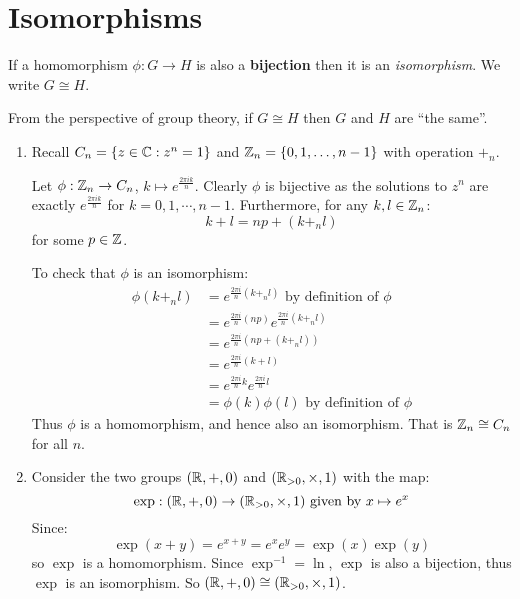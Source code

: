 \documentclass[../main.tex]{subfiles}
\begin{document}
\section{Isomorphisms}
\begin{definition}[Isomorphism]
  If a homomorphism $\phi: G \to H$ is also a \textbf{bijection} then it is an \textit{isomorphism}. We write $G \cong H$.
\end{definition}
From the perspective of group theory, if $G \cong H$ then $G$ and $H$ are ``the same''.
\begin{example}
  \begin{enumerate}
    \item Recall $C_n = \{z \in \mathbb{C} : z^{n} = 1\}$ and $\mathbb{Z}_n = \{0, 1, \ldots, n - 1\}$ with operation $+_n$.

      Let $\phi: \mathbb{Z}_n \to C_n$, $k \mapsto e^{\frac{2\pi i k}{n}}$.
      Clearly $\phi$ is bijective as the solutions to $z^{n}$ are exactly $e^{\frac{2\pi i k}{n}}$ for $k = 0, 1, \cdots, n-1$.
      Furthermore, for any $k, l \in \mathbb{Z}_n$:
      \[
        k + l = np + (k +_n l)
      \]
      for some $p \in \mathbb{Z}$.

      To check that $\phi$ is an isomorphism:
      \begin{align*}
        \phi(k +_n l) &= e^{\frac{2 \pi i}{n}(k +_n l)} \text{ by definition of $\phi$}\\
                      &= e^{\frac{2 \pi i}{n}(np)} e^{\frac{2 \pi i}{n}(k +_n l)} \\
                      &= e^{\frac{2 \pi i}{n}(np + (k +_n l))} \\
                      &=e^{\frac{2 \pi i}{n}(k + l)} \\
                      &= e^{\frac{2 \pi i}{n} k} e^{\frac{2 \pi i}{n} l} \\
                      &= \phi(k) \phi(l) \text{ by definition of $\phi$}
      \end{align*}
      Thus $\phi$ is a homomorphism, and hence also an isomorphism.
      That is $\mathbb{Z}_n \cong C_n$ for all $n$.
    \item Consider the two groups $(\mathbb{R}, +, 0)$ and $(\mathbb{R}_{> 0}, \times, 1)$ with the map:
      \[
        \exp: (\mathbb{R}, +, 0) \to (\mathbb{R}_{> 0}, \times, 1) \text{ given by } x \mapsto e^{x}
      \]
      Since:
      \[
        \exp(x + y) = e^{x + y} = e^{x}e^{y} = \exp(x)\exp(y)
      \]
      so $\exp$ is a homomorphism.
      Since $\exp^{-1} = \ln$, $\exp$ is also a bijection, thus $\exp$ is an isomorphism.
      So $(\mathbb{R}, + , 0) \cong (\mathbb{R}_{>0}, \times, 1)$.
  \end{enumerate}
\end{example}
\end{document}
